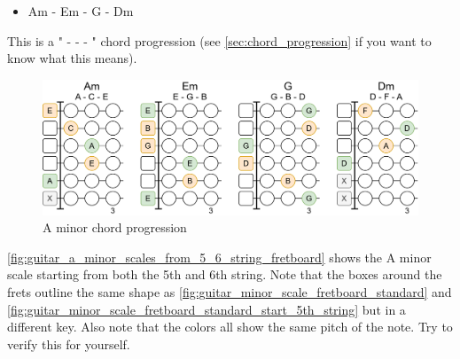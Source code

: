 \begin{itemize}
	\item Am - Em - G - Dm
\end{itemize}

This is a " -  -  - " chord progression (see \autoref{sec:chord_progression} if you want to know what this means).

\begin{figure}[h]
	\centering
	\includegraphics[height=0.19\textheight]{../../Images/AMinor_chord_progression.png}
	\caption{A minor chord progression}
	\label{fig:a_minor_chord_progression}
\end{figure}

\autoref{fig:guitar_a_minor_scales_from_5_6_string_fretboard} shows the A minor scale starting from both the 5th and 6th string. Note that the boxes around the frets outline the same shape as \autoref{fig:guitar_minor_scale_fretboard_standard} and \autoref{fig:guitar_minor_scale_fretboard_standard_start_5th_string} but in a different key. Also note that the colors all show the same pitch of the note. Try to verify this for yourself.

